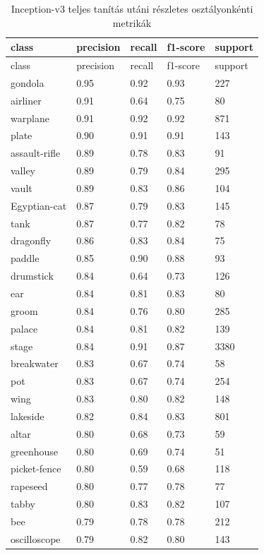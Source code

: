 \begin{center}
\begin{longtable}{lllll}
\caption{Inception-v3 teljes tanítás utáni részletes osztályonkénti metrikák}\label{tab:phase2_Inception-v3_class_table}\\
\toprule
class & precision & recall & f1-score & support \\
\midrule
\endfirsthead
\toprule
class & precision & recall & f1-score & support \\
\midrule
\endhead
gondola & 0.95 & 0.92 & 0.93 & 227 \\
airliner & 0.91 & 0.64 & 0.75 & 80 \\
warplane & 0.91 & 0.92 & 0.92 & 871 \\
plate & 0.90 & 0.91 & 0.91 & 143 \\
assault-rifle & 0.89 & 0.78 & 0.83 & 91 \\
valley & 0.89 & 0.79 & 0.84 & 295 \\
vault & 0.89 & 0.83 & 0.86 & 104 \\
Egyptian-cat & 0.87 & 0.79 & 0.83 & 145 \\
tank & 0.87 & 0.77 & 0.82 & 78 \\
dragonfly & 0.86 & 0.83 & 0.84 & 75 \\
paddle & 0.85 & 0.90 & 0.88 & 93 \\
drumstick & 0.84 & 0.64 & 0.73 & 126 \\
ear & 0.84 & 0.81 & 0.83 & 80 \\
groom & 0.84 & 0.76 & 0.80 & 285 \\
palace & 0.84 & 0.81 & 0.82 & 139 \\
stage & 0.84 & 0.91 & 0.87 & 3380 \\
breakwater & 0.83 & 0.67 & 0.74 & 58 \\
pot & 0.83 & 0.67 & 0.74 & 254 \\
wing & 0.83 & 0.80 & 0.82 & 148 \\
lakeside & 0.82 & 0.84 & 0.83 & 801 \\
altar & 0.80 & 0.68 & 0.73 & 59 \\
greenhouse & 0.80 & 0.69 & 0.74 & 51 \\
picket-fence & 0.80 & 0.59 & 0.68 & 118 \\
rapeseed & 0.80 & 0.77 & 0.78 & 77 \\
tabby & 0.80 & 0.83 & 0.82 & 107 \\
bee & 0.79 & 0.78 & 0.78 & 212 \\
oscilloscope & 0.79 & 0.82 & 0.80 & 143 \\

\end{longtable}
\end{center}
